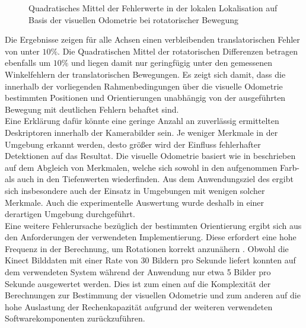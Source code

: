 \begin{figure}[!ht]

\caption{Quadratisches Mittel der Fehlerwerte in der lokalen Lokalisation auf Basis der visuellen Odometrie bei rotatorischer Bewegung}
\label{fig.loc_loc_rot_fovis}
\end{figure}%


Die Ergebnisse zeigen für alle Achsen einen verbleibenden translatorischen Fehler von unter $10\%$. Die Quadratischen Mittel der rotatorischen Differenzen betragen ebenfalls um $10\%$ und liegen damit nur geringfügig unter den gemessenen Winkelfehlern der translatorischen Bewegungen. Es zeigt sich damit, dass die innerhalb der vorliegenden Rahmenbedingungen über die visuelle Odometrie bestimmten Positionen und Orientierungen unabhängig von der ausgeführten Bewegung mit deutlichen Fehlern behaftet sind.\\

Eine Erklärung dafür könnte eine geringe Anzahl an zuverlässig ermittelten Deskriptoren innerhalb der Kamerabilder sein. Je weniger Merkmale in der Umgebung erkannt werden, desto größer wird der Einfluss fehlerhafter Detektionen auf das Resultat. Die visuelle Odometrie basiert wie in  beschrieben auf dem Abgleich von Merkmalen, welche sich sowohl in den aufgenommen Farb- als auch in den Tiefenwerten wiederfinden. Aus dem Anwendungsziel des  ergibt sich insbesondere auch der Einsatz in Umgebungen mit wenigen solcher Merkmale. Auch die experimentelle Auswertung wurde deshalb in einer derartigen Umgebung durchgeführt.\\

Eine weitere Fehlerursache bezüglich der bestimmten Orientierung ergibt sich aus den Anforderungen der verwendeten Implementierung. Diese erfordert eine hohe Frequenz in der Berechnung, um Rotationen korrekt anzunähern \cite{Fovis}. Obwohl die Kinect Bilddaten mit einer Rate von \SI{30}{} Bildern pro Sekunde liefert konnten auf dem verwendeten System während der Anwendung nur etwa \SI{5}{} Bilder pro Sekunde ausgewertet werden. Dies ist zum einen auf die Komplexität der Berechnungen zur Bestimmung der visuellen Odometrie und zum anderen auf die hohe Auslastung der Rechenkapazität aufgrund der weiteren verwendeten Softwarekomponenten zurückzuführen.\\ 

